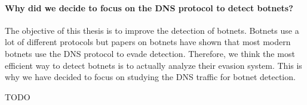 \paragraph{Why did we decide to focus on the DNS protocol to detect botnets?}
The objective of this thesis is to improve the detection of botnets. Botnets use a lot of different protocols but papers on botnets have shown that most modern botnets use the DNS protocol to evade detection. Therefore, we think the most efficient way to detect botnets is to actually analyze their evasion system. This is why we have decided to focus on studying the DNS traffic for botnet detection.

TODO

